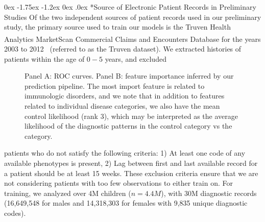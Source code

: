 \documentclass[onecolumn, compsoc,11pt]{IEEEtran}
\makeatletter
\renewcommand\subsection{\@startsection {subsection}{2}{\z@}%
                                   {0ex \@plus -1.75ex \@minus -1.2ex}%
                                   {0ex \@plus.0ex}%
                                   {\fontsize{11}{11}\selectfont\bfseries\sffamily\color{black}}}
\renewcommand{\captionN}[1]{\caption{\color{CadetBlue4!80!black} \sffamily \fontsize{9}{10}\selectfont #1  }}
\makeatother
\begin{document}
\subsection*{Source of Electronic Patient Records in Preliminary Studies}
Of the two independent sources of patient records used in our preliminary study,  the primary source used to train our models  is the Truven Health Analytics  MarketScan\textsuperscript{\textregistered} Commercial Claims and Encounters Database for the years 2003 to 2012~\cite{hansen2017truven} (referred to  as the Truven dataset). 
We extracted histories of patients within the age of $0-5$ years, and excluded \begin{figure}
   \tikzexternaldisable

     \vspace{-10pt}

  \captionN{Panel A:  ROC curves. Panel B: feature importance inferred by our prediction pipeline. The most import feature is related to immunologic disorders, and we note that in addition to features related to individual disease categories, we also have the mean control likelihood (rank 3), which may be interpreted as the average likelihood of the diagnostic patterns in the control category vs the \treatment category. 
     }\label{fig1}
        \vspace{-15pt}

\end{figure} patients who do not satisfy the following criteria: 1) At least one code of any available phenotypes is present, 2) Lag between first and last available record for a patient should be at least 15 weeks. These exclusion criteria ensure that we are not considering patients with too few observations to either train on. For training, we analyzed over 4M children ($n=4.4M$), with 30M diagnostic records (16,649,548 for males and  14,318,303  for females with 9,835 unique diagnostic codes).

  
\end{document}
